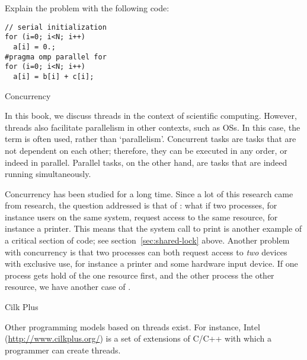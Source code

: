 \begin{exercise}
  Explain the problem with the following code:
\begin{verbatim}
// serial initialization
for (i=0; i<N; i++)
  a[i] = 0.;
#pragma omp parallel for
for (i=0; i<N; i++)
  a[i] = b[i] + c[i];
\end{verbatim}
\end{exercise}


 {Concurrency}

In this book, we discuss threads in the context of scientific
computing. However, threads also facilitate parallelism in other contexts,
such as \acfp{OS}. In this case, the term
 is often used, rather than `parallelism'.
Concurrent tasks are tasks that are not dependent on each other; 
therefore, they can be executed in any order, or indeed in parallel.
Parallel tasks, on the other hand, are tasks that are indeed running 
simultaneously.

Concurrency has been studied for a long time. Since a lot of
this research came from  research,
the question
addressed is that of : what if two
processes, for instance users on the same system, request access to
the same resource, for instance a printer. This means that the system
call to print is another example of a critical section of code; see
section~\ref{sec:shared-lock} above. Another problem with concurrency
is that two processes can both request access to \emph{two} devices
with exclusive use, for instance a printer and some hardware input
device. If one process gets hold of the one resource first, and the
other process the other resource, we have another case of
.

 {Cilk Plus}

Other programming models based on threads exist. For instance,
Intel  (\url{http://www.cilkplus.org/})
is a set of extensions of C/C++ with which a
programmer can create threads.

